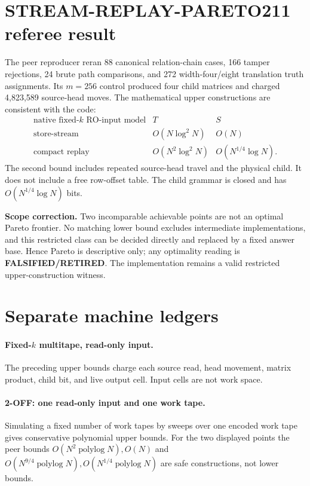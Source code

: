 \documentclass[11pt]{article}
\begin{document}
\section{STREAM-REPLAY-PARETO211 referee result}
The peer reproducer reran 88 canonical relation-chain cases, 166 tamper
rejections, 24 brute path comparisons, and 272 width-four/eight translation
truth assignments. Its $m=256$ control produced four child matrices and
charged 4,823,589 source-head moves. The mathematical upper constructions are
consistent with the code:
\[
\begin{array}{c|c|c}
\text{native fixed-$k$ RO-input model}&T&S\\\hline
\text{store-stream}&O(N\log^2N)&O(N)\\
\text{compact replay}&O(N^2\log^2N)&O(N^{1/4}\log N).
\end{array}
\]
The second bound includes repeated source-head travel and the physical child.
It does not include a free row-offset table. The child grammar is closed and
has $O(N^{1/4}\log N)$ bits.

\textbf{Scope correction.} Two incomparable achievable points are not an
optimal Pareto frontier. No matching lower bound excludes intermediate
implementations, and this restricted class can be decided directly and
replaced by a fixed answer base. Hence Pareto is descriptive only; any
optimality reading is \textbf{FALSIFIED/RETIRED}. The implementation remains
a valid restricted upper-construction witness.

\section{Separate machine ledgers}
\paragraph{Fixed-$k$ multitape, read-only input.}
The preceding upper bounds charge each source read, head movement, matrix
product, child bit, and live output cell. Input cells are not work space.
\paragraph{2-OFF: one read-only input and one work tape.}
Simulating a fixed number of work tapes by sweeps over one encoded work tape
gives conservative polynomial upper bounds. For the two displayed points the
peer bounds $O(N^2\operatorname{polylog}N),O(N)$ and
$O(N^{9/4}\operatorname{polylog}N),O(N^{1/4}\operatorname{polylog}N)$
are safe constructions, not lower bounds.
\end{document}
